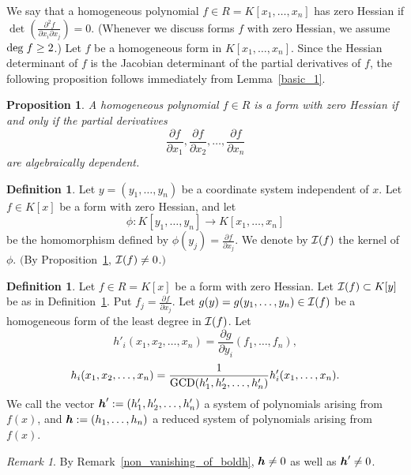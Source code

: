 \documentclass[12pt]{article}
\newtheorem{proposition}[theorem]{Proposition}
\theoremstyle{definition}
\newtheorem{definition}[theorem]{Definition}
\theoremstyle{remark}
\newtheorem{remark}[theorem]{Remark}
\def\deg{{\rm deg}}
\def\cI{{\cal I}}
\def\boldh{\mbox{\boldmath $h$}}
\def\pa{\partial}
\begin{document}
We say that a homogeneous polynomial $f \in R=K[x_1, \ldots, x_n]$ has zero Hessian if   
$\det\left(\frac{\pa ^2f}{\pa x_i \pa x_j}\right)=0$. 
(Whenever we discuss forms $f$ with zero Hessian, we assume $\deg \; f \geq 2$.)
Let $f$ be a homogeneous form in $K[x_1, \ldots, x_n]$.  
Since the Hessian determinant of $f$ is the Jacobian determinant of the partial derivatives of $f$, 
the following proposition follows immediately from Lemma~\ref{basic_1}. 

\begin{proposition} \label{basic_2}    %
A homogeneous polynomial $f \in R$ is  a form with zero Hessian 
if and only if the partial derivatives
\[\frac{\pa f}{\pa x_1},\frac{\pa f}{\pa x_2},\ldots, \frac{\pa f}{\pa x_n} \]
are algebraically dependent. 
\end{proposition}

\begin{definition} \label{def_of_ideal_associated_to_form_with_zero_hessian}   %
Let $y=(y_1, \ldots, y_n)$ be a coordinate system independent of $x$.  
Let  $f \in K[x]$ be a form with zero Hessian, and let 
\[\phi :K[y_1, \ldots, y_n] \rightarrow K[x_1, \ldots, x_n] \]
be the homomorphism defined by $\phi(y_j)= \frac{\pa f}{\pa x_j}$.  
We denote by $\cI(f)$ the kernel of $\phi$. $($By Proposition~\ref{basic_2}, $\cI(f) \neq 0$.$)$
\end{definition}


\begin{definition}  \label{reduced_system_of_polynomials}   %
Let $f \in R=K[x]$ be a form with zero Hessian.  
Let $\cI(f) \subset K[y]$ be as in Definition~\ref{def_of_ideal_associated_to_form_with_zero_hessian}. 
Put $f_j=\frac{\pa f}{\pa x_j}$.  
Let $g(y)=g(y_1, \ldots, y_n) \in \cI(f)$ be 
a homogeneous form of the least degree in $\cI(f)$.  
Let \[h'_i(x_1, x_2, \ldots, x_n)=\frac{\pa g}{\pa y_i}(f_1, \ldots, f_n),\]
\[h_i(x_1, x_2, \ldots, x_n)=\frac{1}{{\rm GCD}(h'_1, h'_2, \ldots, h'_n)}h'_i(x_1, \ldots, x_n). \]
We call the vector $\boldh ':=(h'_1, h'_2, \ldots, h'_n)$ 
a system of polynomials arising from  $f(x)$, and 
$\boldh:=(h_1, \ldots, h_n)$ a reduced system of polynomials arising from $f(x)$.  
\end{definition}

\begin{remark}   %
By Remark~\ref{non_vanishing_of_boldh}, 
$\boldh \neq 0$ as well as  $\boldh ' \neq 0$.   
\end{remark}
\end{document}
